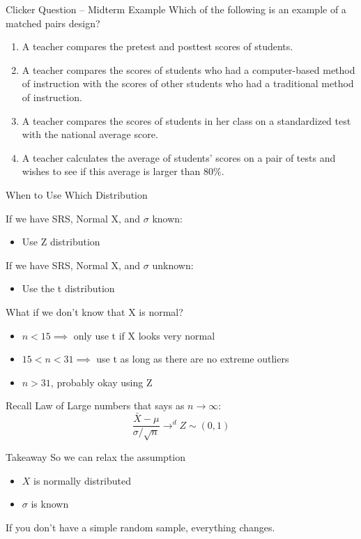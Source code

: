 \documentclass{beamer}
\begin{document}
\begin{frame}{Clicker Question -- Midterm Example}
	Which of the following is an example of a matched pairs design?
	\begin{enumerate}[label=(\alph*)]
		\item A teacher compares the pretest and posttest scores of students. %
		\item A teacher compares the scores of students who had a computer-based method of instruction with the scores of other students who had a traditional method of instruction.
		\item A teacher compares the scores of students in her class on a standardized test with the national average score.
		\item A teacher calculates the average of students' scores on a pair of tests and wishes to see if this average is larger than 80\%.
	\end{enumerate}
\end{frame}


\begin{frame}{When to Use Which Distribution}
	
	If we have SRS, Normal X, and $\sigma$ known:
	\begin{itemize}
		\item Use Z distribution
	\end{itemize}

	If we have SRS, Normal X, and $\sigma$ unknown:
	\begin{itemize}
		\item Use the t distribution
	\end{itemize}

	What if we don't know that X is normal?
	\begin{itemize}
		\item $n<15 \implies$ only use t if X looks very normal
		
		\item $15<n<31 \implies$ use t as long as there are no extreme outliers
		
		\item $n>31$, probably okay using Z
	\end{itemize}
	
	Recall Law of Large numbers that says as $n \to \infty$:
		\[ 
			\frac{\bar{X}-\mu}{\sigma/\sqrt{n}} \to^d Z\sim(0,1)
		\]
	
\end{frame} 

\begin{frame}{Takeaway}
	So we can relax the assumption
	\begin{itemize}
		\item $X$ is normally distributed
		\item $\sigma$ is known
	\end{itemize}
	
	If you don't have a simple random sample, everything changes. 
\end{frame}
\end{document}
